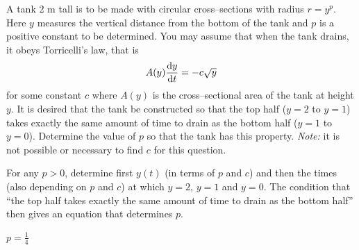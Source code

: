 \begin{question}[2002A]
A tank 2 m tall is to be made with circular cross--sections
with radius $r=y^p$. Here $y$ measures the vertical distance from
the bottom of the tank and $p$ is a positive constant to be
determined. You may assume that when the tank drains, it obeys
Torricelli's law, that is
\begin{align*}
A(y)\diff{y}{t}=-c\sqrt{y}
\end{align*}
for some constant $c$ where $A(y)$ is the cross--sectional area of the
tank at height $y$. It is desired that the tank be constructed so
that the top half
($y=2$ to $y=1$) takes exactly the same amount of time to drain as the
bottom half ($y=1$ to $y=0$). Determine the value of $p$ so that the tank
has this property. \emph{Note:} it is not possible or necessary to find
$c$ for this question.
\end{question}
\begin{hint}
For any $p>0$, determine first $y(t)$ (in terms of $p$ and $c$) and then the times (also depending on $p$ and $c$) at which
$y=2$, $y=1$ and $y=0$. The condition that ``the top half
takes exactly the same amount of time to drain as the
bottom half'' then gives an equation that determines $p$.
\end{hint}

\begin{answer}
$p=\frac{1}{4}$
\end{answer}

